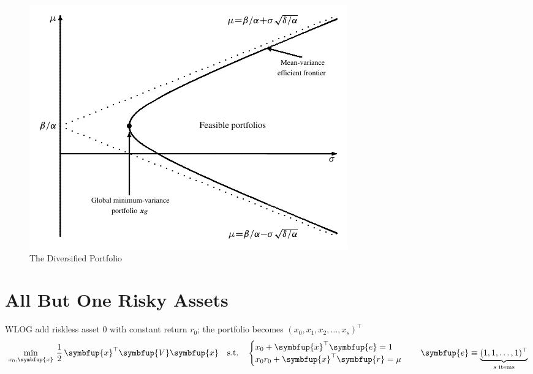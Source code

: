 \documentclass[11pt]{extarticle}
\newcommand{\ds}{\displaystyle}
\newcommand{\vx}{\symbfup{x}}
\newcommand{\vR}{\symbfup{R}}
\newcommand{\vV}{\symbfup{V}}
\newcommand{\ve}{\symbfup{e}}
\newcommand{\vr}{\symbfup{r}}
\DeclareMathOperator\cov{cov}
\theoremstyle{definition}
\begin{document}
\newpage

\begin{figure}[!htbp]
  \centering
  \includegraphics[scale=1.1,page=2]{fig/sfm.pdf}
  \caption{The Diversified Portfolio}
  \label{fig:mv2}
\end{figure}

\newpage


\section*{All But One Risky Assets}

\noindent WLOG add riskless asset $0$ with constant return $r_0$; the portfolio becomes $(x_0, x_1, x_2, \ldots, x_s)^\top$ \\
\begin{align*}
  \min_{x_0, \vx}\,\frac{1}{2}\,\vx^\top\vV\vx\quad\text{s.t.}\quad\begin{cases} x_0 + \vx^\top\ve = 1 \\ x_0 r_0 + \vx^\top\vr = \mu\end{cases}\quad\ve\equiv\underbrace{(1, 1, \ldots, 1)^\top}_{\text{$s$ items}}
\end{align*}
\end{document}
